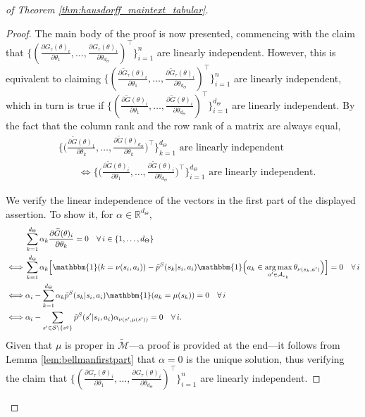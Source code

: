 \documentclass{amsart}
\DeclareMathOperator*{\argmax}{arg\,max}
\begin{document}
\begin{proof}[of Theorem \ref{thm:hausdorff_maintext_tabular}]
\begin{proof}
\begin{sloppypar}
 The main body of the proof is now presented, commencing with the claim that $\{( \frac{\partial G_\tau(\theta)_i}{\partial \theta_1},\dots,\frac{\partial G_\tau(\theta)_i}{\partial \theta_{d_\Theta}})^\top\}_{i=1}^n$ are linearly independent. However, this is equivalent to claiming $\{( \frac{\partial \widetilde{G}_\tau(\theta)_i}{\partial \theta_1},\dots,\frac{\partial \widetilde{G}_\tau(\theta)_i}{\partial \theta_{d_\Theta}})^\top\}_{i=1}^n$ are linearly independent, which in turn is true if $\{( \frac{\partial \widetilde{G}(\theta)_i}{\partial \theta_1},\dots,\frac{\partial \widetilde{G}(\theta)_i}{\partial \theta_{d_\Theta}})^\top\}_{i=1}^{d_\Theta}$ are linearly independent. By the fact that the column rank and the row rank of a matrix are always equal,
\begin{align*}
    &\bigg\{\bigg( \frac{\partial \widetilde{G}(\theta)_1}{\partial \theta_k},\dots,\frac{\partial \widetilde{G}(\theta)_{d_\Theta}}{\partial \theta_{k}}\bigg)^\top\bigg\}_{k=1}^{d_\Theta} \text{ are linearly independent} \\
    &\qquad\iff \bigg\{\bigg( \frac{\partial \widetilde{G}(\theta)_i}{\partial \theta_1},\dots,\frac{\partial \widetilde{G}(\theta)_i}{\partial \theta_{d_\Theta}}\bigg)^\top\bigg\}_{i=1}^{d_\Theta} \text{ are linearly independent}.
\end{align*}
\end{sloppypar}
 We verify the linear independence of the vectors in the first part of the displayed assertion. To show it, for  $\alpha\in \mathbb{R}^{d_\Theta}$,
 \begin{align*} &\sum_{k=1}^{d_\Theta} \alpha_k\frac{\partial \widetilde{G}(\theta)_i}{\partial \theta_k} = 0 \quad \forall \, i \in \{1,\dots,d_\Theta\}\\
 \iff&  \sum_{k=1}^{d_\Theta} \alpha_k \Big[\mathbbm{1}(k=\nu(s_i,a_i)) - \tilde{p}^S(s_k|s_i,a_i) \mathbbm{1}\Big(a_k \in \argmax_{a^{\prime} \in \mathcal{A}_{s_k}}\theta_{\nu(s_k,a^{\prime})}\Big)\Big]=0 \quad \forall \, i\\
 \iff & \alpha_i -\sum_{k=1}^{d_\Theta} \alpha_k 
 \tilde{p}^S(s_k|s_i,a_i)   \mathbbm{1}(a_k=\mu(s_k))=0 \quad \forall \, i \\
 \iff& \alpha_i -\sum_{s^\prime \in \mathcal{S} \setminus \{s^g\}} \tilde{p}^S(s^\prime|s_i,a_i) \alpha_{\nu(s^\prime,\mu(s^\prime))}=0  \quad \forall \, i .
 \end{align*}
Given that $\mu$ is proper in $\widetilde{\mathcal{M}}$---a proof is provided at the end---it follows from Lemma \ref{lem:bellmanfirstpart} that $\alpha=0$ is the unique solution, thus verifying the claim that $\{( \frac{\partial G_\tau(\theta)_i}{\partial \theta_1},\dots,\frac{\partial G_\tau(\theta)_i}{\partial \theta_{d_\Theta}})^\top\}_{i=1}^n$ are linearly independent.


\end{proof}
\end{proof}
\end{document}
